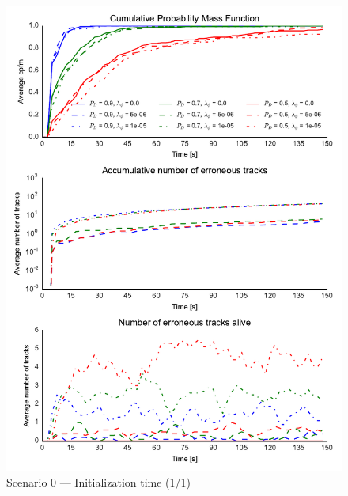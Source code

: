 
\begin{figure}
\centering
\includegraphics{Figures/plots/Scenario0_Init-Time(1-1).pdf}
\caption{Scenario 0 --- Initialization time (1/1)}\label{fig:init0_time_1-1}
\end{figure}

